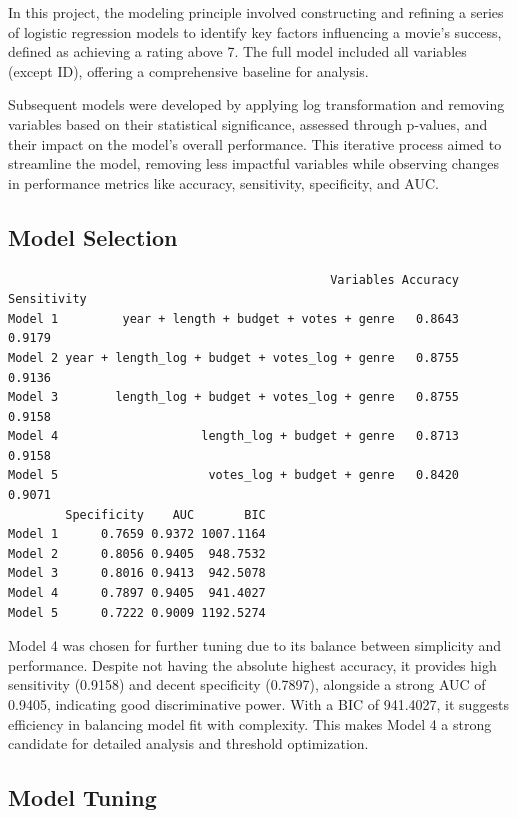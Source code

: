\documentclass[
  11pt,
]{article}
\begin{document}
In this project, the modeling principle involved constructing and
refining a series of logistic regression models to identify key factors
influencing a movie's success, defined as achieving a rating above 7.
The full model included all variables (except ID), offering a
comprehensive baseline for analysis.

Subsequent models were developed by applying log transformation and
removing variables based on their statistical significance, assessed
through p-values, and their impact on the model's overall performance.
This iterative process aimed to streamline the model, removing less
impactful variables while observing changes in performance metrics like
accuracy, sensitivity, specificity, and AUC.

\hypertarget{model-selection}{%
\subsection{Model Selection}\label{model-selection}}

\begin{verbatim}
                                             Variables Accuracy Sensitivity
Model 1         year + length + budget + votes + genre   0.8643      0.9179
Model 2 year + length_log + budget + votes_log + genre   0.8755      0.9136
Model 3        length_log + budget + votes_log + genre   0.8755      0.9158
Model 4                    length_log + budget + genre   0.8713      0.9158
Model 5                     votes_log + budget + genre   0.8420      0.9071
        Specificity    AUC       BIC
Model 1      0.7659 0.9372 1007.1164
Model 2      0.8056 0.9405  948.7532
Model 3      0.8016 0.9413  942.5078
Model 4      0.7897 0.9405  941.4027
Model 5      0.7222 0.9009 1192.5274
\end{verbatim}

Model 4 was chosen for further tuning due to its balance between
simplicity and performance. Despite not having the absolute highest
accuracy, it provides high sensitivity (0.9158) and decent specificity
(0.7897), alongside a strong AUC of 0.9405, indicating good
discriminative power. With a BIC of 941.4027, it suggests efficiency in
balancing model fit with complexity. This makes Model 4 a strong
candidate for detailed analysis and threshold optimization.

\hypertarget{model-tuning}{%
\subsection{Model Tuning}\label{model-tuning}}
\end{document}
